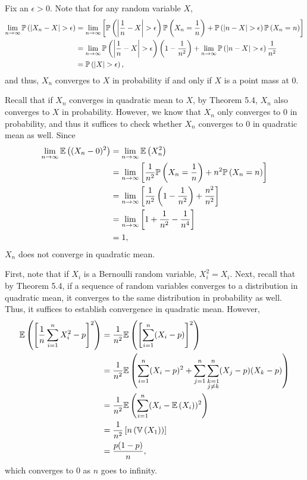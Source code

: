 \begin{ex}
  Fix an $\epsilon>0$. Note that for any random variable $X$,
  \begin{align*}
    \lim_{n\to\infty}\P{|X_n-X|>\epsilon}
     & =\lim_{n\to\infty}\left[\P{\left|\frac{1}{n}-X\right|>\epsilon}\P{X_n=\frac{1}{n}}
      +\P{|n-X|>\epsilon}\P{X_n=n}\right]                                                    \\
     & =\lim_{n\to\infty}\P{\left|\frac{1}{n}-X\right|>\epsilon}\left(1-\frac{1}{n^2}\right)
    +\lim_{n\to\infty}\P{|n-X|>\epsilon}\frac{1}{n^2}                                        \\
     & =\P{|X|>\epsilon},
  \end{align*}
  and thus, $X_n$ converges to $X$ in probability if and only if $X$ is a point
  mass at $0$.

  Recall that if $X_n$ converges in quadratic mean to $X$, by Theorem 5.4,
  $X_n$ also converges to $X$ in probability. However, we know that $X_n$
  only converges to $0$ in probability, and thus it suffices to check whether
  $X_n$ converges to $0$ in quadratic mean as well. Since
  \begin{align*}
    \lim_{n\to\infty}\mathbb{E}\left((X_n-0)^2\right)
     & =\lim_{n\to\infty}\mathbb{E}\left(X_n^2\right)                                                              \\
     & =\lim_{n\to\infty}\left[\frac{1}{n^2}\mathbb{P}\left(X_n=\frac{1}{n}\right)+n^2\mathbb{P}\left(X_n=n\right)\right]             \\
     & =\lim_{n\to\infty}\left[\frac{1}{n^2}\left(1-\frac{1}{n^2}\right)+\frac{n^2}{n^2}\right] \\
     & =\lim_{n\to\infty}\left[1+\frac{1}{n^2}-\frac{1}{n^4}\right]                             \\
     & = 1,
  \end{align*}
  $X_n$ does not converge in quadratic mean.
\end{ex}

\begin{ex}
  First, note that if $X_i$ is a Bernoulli random variable, $X_i^2=X_i$. Next,
  recall that by Theorem 5.4, if a sequence of random variables converges to a
  distribution in quadratic mean, it converges to the same distribution in
  probability as well. Thus, it suffices to establish convergence in quadratic
  mean. However,
  \begin{align*}
    \mathbb{E}\left(\left[\frac{1}{n}\sum_{i=1}^nX_i^2 -p\right]^2\right)
     & =\frac{1}{n^2}\mathbb{E}\left(\left[\sum_{i=1}^n(X_i -p)\right]^2\right)                   \\
     & =\frac{1}{n^2}\mathbb{E}\left(\sum_{i=1}^n(X_i-p)^2 +\sum_{j=1}^n\sum_{\substack{k=1 \\ j\neq k}}^n (X_j-p)(X_k-p)\right) \\
     & =\frac{1}{n^2}\mathbb{E}\left(\sum_{i=1}^n(X_i-\mathbb{E}\left(X_i\right))^2\right)                           \\
     & =\frac{1}{n^2}\left[n\left(\mathbb{V}\left(X_1\right) \right) \right]                    \\
     & =\frac{p(1-p)}{n},
  \end{align*}
  which converges to $0$ as $n$ goes to infinity.
\end{ex}

